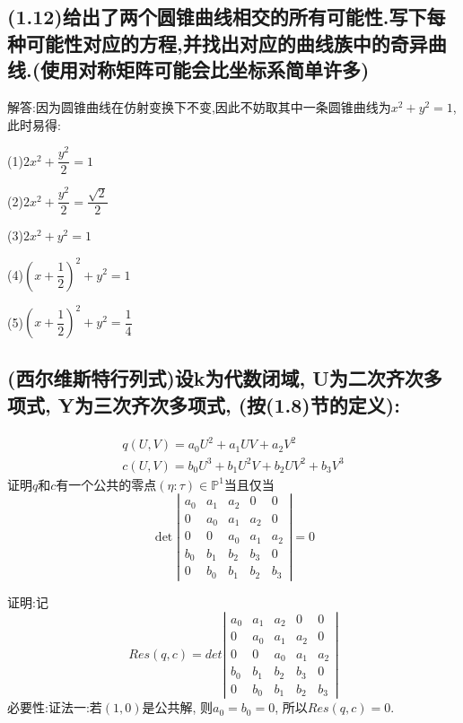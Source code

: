 \documentclass[UTF8]{book}
\begin{document}
		\subsection{(1.12)给出了两个圆锥曲线相交的所有可能性.写下每种可能性对应的方程,并找出对应的曲线族中的奇异曲线.(使用对称矩阵可能会比坐标系简单许多)}
		
			解答:因为圆锥曲线在仿射变换下不变,因此不妨取其中一条圆锥曲线为$ x^{2}+y^{2} = 1 $,此时易得:
			
			
			(1)$ 2x^{2}+\dfrac{y^{2}}{2} = 1 $
			
			
			(2)$ 2x^{2}+\dfrac{y^{2}}{2} = \dfrac{\sqrt{2}}{2} $
			
			
			(3)$ 2x^{2}+y^{2} = 1 $
			
			
			(4)$ (x+\dfrac{1}{2})^{2}+y^{2} = 1 $
			
			
			(5)$ (x+\dfrac{1}{2})^{2}+y^{2} = \dfrac{1}{4} $
		
		
		
		
		
		\subsection{(西尔维斯特行列式)设k为代数闭域, U为二次齐次多项式, Y为三次齐次多项式, (按(1.8)节的定义):}
		\begin{equation*}
		\begin{array}{l}{q(U,V)=a_{0}U^{2}+a_{1}UV+a_{2}V^{2}} \\ {c(U,V)=b_{0}U^{3}+b_{1}U^{2}V+b_{2}UV^{2}+b_{3}V^{3}}\end{array}
		\end{equation*}
		证明$ q $和$ c $有一个公共的零点$(\eta:\tau)\in \mathbb{P}^{1}$当且仅当
		\begin{equation*}
		\operatorname{det}\left|\begin{array}{ccccc}{a_{0}} & {a_{1}} & {a_{2}} & {0} & {0} \\ {0} & {a_{0}} & {a_{1}} & {a_{2}} & {0} \\ {0} & {0} & {a_{0}} & {a_{1}} & {a_{2}} \\ {b_{0}} & {b_{1}} & {b_{2}} & {b_{3}} & {0} \\ {0} & {b_{0}} & {b_{1}} & {b_{2}} & {b_{3}}\end{array}\right|=0
		\end{equation*}
		
			证明:记\[Res(q,c)=
			det\left|\begin{array}{cccccc}
			  a_{0} &  a_{1} & a_{2}&0 &0\\
			    0 & a_{0} &  a_{1} & a_{2}&0 \\
			    0 & 0 &a_{0} &  a_{1} & a_{2}\\
			    b_{0} &  b_{1} & b_{2}& b_{3} &0\\
			    0 &  b_{0} &  b_{1} & b_{2}& b_{3}
			\end{array}\right|
			\]
			必要性:证法一:若$ (1,0) $是公共解, 则$a_{0}=b_{0}=0$, 所以$ Res(q,c)=0 $.
			
\end{document}
